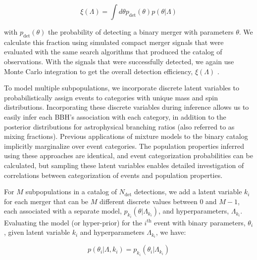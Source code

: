\begin{equation} \label{eq:detfrac}
    \xi(\Lambda) = \int d\theta p_\mathrm{det}(\theta) p(\theta | \Lambda)
\end{equation}

\noindent with $p_\mathrm{det}(\theta)$ the probability of detecting a binary merger with parameters $\theta$. We calculate this fraction using simulated compact merger signals that were evaluated with the same search algorithms that produced the catalog of observations. With the signals that were successfully detected, we again use Monte Carlo integration to get the overall detection efficiency, $\xi(\Lambda)$ \citep{1712.00482, 1904.10879, 2204.00461}.

To model multiple subpopulations, we incorporate discrete latent variables to probabilistically assign events to categories with unique mass and spin distributions.  Incorporating these discrete variables during inference allows us to easily infer each BBH's association with each category, in addition to the posterior distributions for astrophysical branching ratios (also referred to as mixing fractions). Previous applications of mixture models to the binary catalog \citep{10.3847/2041-8213/abe949,2022arXiv220902206T} implicitly marginalize over event categories. The population properties inferred using these approaches are identical, and event categorization probabilities can be calculated, but sampling these latent variables enables detailed investigation of correlations between categorization of events and population properties. 

For $M$ subpopulations in a catalog of $N_\mathrm{det}$ detections, we add a latent variable $k_i$ for each merger that can be $M$ different discrete values between $0$ and $M-1$, each associated with a separate model, $p_{k_i}(\theta | \Lambda_{k_i})$, and hyperparameters, $\Lambda_{k_i}$. Evaluating the model (or hyper-prior) for the $i^\mathrm{th}$ event with binary parameters, $\theta_i$, given latent variable $k_i$ and hyperparameters $\Lambda_{k_i}$, we have:

\begin{equation} \label{eq:latent}
    p(\theta_i | \Lambda, k_i) = p_{k_i}(\theta_i | \Lambda_{k_i})
\end{equation}

